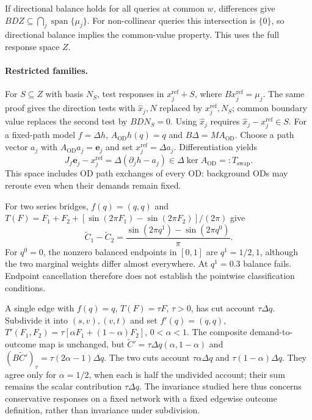 If directional balance holds for all
queries at common $w$, differences give
$BDZ\subseteq\bigcap_j\operatorname{span}\{\mu_j\}$. For non-collinear
queries this intersection is $\{0\}$, so directional balance implies
the common-value property. This uses the full response space $Z$.

\paragraph{Restricted families.}\label{app:membership}
For $S\subseteq Z$ with basis $N_S$, test responses in
$x_j^{\mathrm{ref}}+S$, where $Bx_j^{\mathrm{ref}}=\mu_j$.
The same proof gives the direction tests with $\hat x_j,N$ replaced
by $x_j^{\mathrm{ref}},N_S$; common boundary value replaces the second test by
$BDN_S=0$. Using $\hat x_j$ requires
$\hat x_j-x_j^{\mathrm{ref}}\in S$. For a fixed-path model $f=\Delta h$,
$A_{\mathrm{OD}}h(q)=q$ and $B\Delta=MA_{\mathrm{OD}}$. Choose a path
vector $a_j$ with $A_{\mathrm{OD}}a_j=\mathbf e_j$ and set
$x_j^{\mathrm{ref}}=\Delta a_j$. Differentiation yields
\[
J_f\mathbf e_j-x_j^{\mathrm{ref}}
=\Delta(\partial_jh-a_j)\in\Delta\ker A_{\mathrm{OD}}=:T_{\mathrm{swap}}.
\]
This space includes OD path exchanges of every OD: background
ODs may reroute even when their demands remain fixed.

\begin{example}\label{ex:cancellation}
For two series bridges, $f(q)=(q,q)$ and
$T(F)=F_1+F_2+[\sin(2\pi F_1)-\sin(2\pi F_2)]/(2\pi)$ give
\[
\widetilde C_1-\widetilde C_2
=\frac{\sin(2\pi q^1)-\sin(2\pi q^0)}{\pi}.
\]
For $q^0=0$, the nonzero balanced endpoints in $[0,1]$ are
$q^1=1/2,1$, although the two marginal weights differ almost
everywhere. At $q^1=0.3$ balance fails. Endpoint cancellation therefore
does not establish the pointwise classification conditions.
\end{example}

\begin{example}\label{ex:subdivision}
A single edge with $f(q)=q$, $T(F)=\tau F$, $\tau>0$, has cut account
$\tau\Delta q$. Subdivide it into $(s,v),(v,t)$ and set
$f'(q)=(q,q)$,
$T'(F_1,F_2)=\tau[\alpha F_1+(1-\alpha)F_2]$, $0<\alpha<1$.
The composite demand-to-outcome map is unchanged, but
$\widetilde C'=\tau\Delta q(\alpha,1-\alpha)$ and
$(B\widetilde C')_v=\tau(2\alpha-1)\Delta q$.
The two cuts account $\tau\alpha\Delta q$ and
$\tau(1-\alpha)\Delta q$. They agree only for $\alpha=1/2$, when each
is half the undivided account; their sum remains the scalar
contribution $\tau\Delta q$. The invariance studied here thus concerns
conservative responses on a fixed network with a fixed edgewise
outcome definition, rather than invariance under subdivision.
\end{example}

